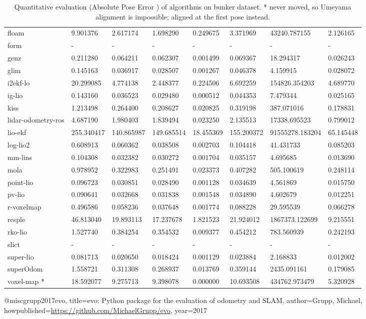 \begin{table}[]
{\begin{tabular}{llllllll}
		floam & 9.901376 & 2.617174 & 1.698290 & 0.249675 & 3.371969 & 43240.787155 & 2.126165 \\
		form & - & - & - & - & - & - & - \\
		genz & 0.211280 & 0.064211 & 0.062307 & 0.001499 & 0.069367 & 18.294317 & 0.026243 \\
		glim & 0.145163 & 0.036917 & 0.028507 & 0.001267 & 0.046378 & 4.159915 & 0.028072 \\
		i2ekf-lo & 20.299085 & 4.774138 & 2.448377 & 0.224506 & 6.692259 & 154826.354203 & 4.689770 \\
		ig-lio & 0.143160 & 0.036523 & 0.029480 & 0.000512 & 0.044353 & 7.479344 & 0.025165 \\
		kiss & 1.213498 & 0.264400 & 0.208627 & 0.020825 & 0.319198 & 387.071016 & 0.178831 \\
		lidar-odometry-ros & 4.687190 & 1.980403 & 1.839494 & 0.023250 & 2.135513 & 17338.695523 & 0.799012 \\
		lio-ekf & 255.340417 & 140.865987 & 149.685514 & 18.455369 & 155.200372 & 91555278.183204 & 65.145448 \\
		log-lio2 & 0.608913 & 0.060362 & 0.038508 & 0.002703 & 0.104418 & 41.431733 & 0.085203 \\
		mm-lins & 0.104308 & 0.032382 & 0.030272 & 0.001704 & 0.035157 & 4.695685 & 0.013690 \\
		mola & 0.978952 & 0.322983 & 0.251491 & 0.023373 & 0.407282 & 505.100619 & 0.248114 \\
		point-lio & 0.096723 & 0.030851 & 0.028490 & 0.001128 & 0.034639 & 4.561869 & 0.015750 \\
		pv-lio & 0.090641 & 0.032668 & 0.031838 & 0.001548 & 0.034890 & 4.602679 & 0.012251 \\
		r-voxelmap & 0.496586 & 0.058236 & 0.037648 & 0.001774 & 0.088228 & 29.595539 & 0.066278 \\
		resple & 46.813040 & 19.893113 & 17.237678 & 1.821523 & 21.924012 & 1867373.122699 & 9.215551 \\
		rko-lio & 1.527740 & 0.384254 & 0.354532 & 0.009377 & 0.454212 & 783.560939 & 0.242193 \\
		slict & - & - & - & - & - & - & - \\
		super-lio & 0.081713 & 0.020650 & 0.018424 & 0.001129 & 0.023884 & 2.168833 & 0.012002 \\
		superOdom & 1.558721 & 0.311308 & 0.268937 & 0.013769 & 0.359144 & 2435.091161 & 0.179085 \\
		voxel-map * & 18.592077 & 9.275713 & 9.398078 & 0.000000 & 10.693508 & 434762.973479 & 5.320928 \\
        	\end{tabular}%
        }
        	\caption{Quantitative evaluation (Absolute Pose Error \cite{grupp2017evo}) of algorithms on bunker dataset. * never moved, so Umeyama alignment is impossible; aligned at the first pose instead.}
        	\label{table3}
\end{table}

@misc{grupp2017evo,
  title={evo: Python package for the evaluation of odometry and SLAM},
  author={Grupp, Michael},
  howpublished={\url{https://github.com/MichaelGrupp/evo}},
  year={2017}
}
